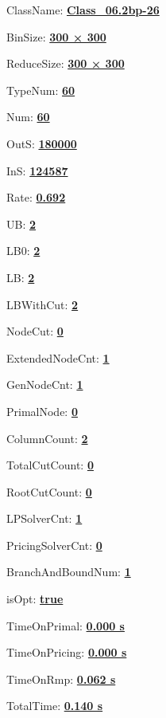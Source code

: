 \documentclass[11pt]{article}
\begin{document}
\pagestyle{empty}


ClassName: \underline{\textbf{Class_06.2bp-26}}
\par
BinSize: \underline{\textbf{300 × 300}}
\par
ReduceSize: \underline{\textbf{300 × 300}}
\par
TypeNum: \underline{\textbf{60}}
\par
Num: \underline{\textbf{60}}
\par
OutS: \underline{\textbf{180000}}
\par
InS: \underline{\textbf{124587}}
\par
Rate: \underline{\textbf{0.692}}
\par
UB: \underline{\textbf{2}}
\par
LB0: \underline{\textbf{2}}
\par
LB: \underline{\textbf{2}}
\par
LBWithCut: \underline{\textbf{2}}
\par
NodeCut: \underline{\textbf{0}}
\par
ExtendedNodeCnt: \underline{\textbf{1}}
\par
GenNodeCnt: \underline{\textbf{1}}
\par
PrimalNode: \underline{\textbf{0}}
\par
ColumnCount: \underline{\textbf{2}}
\par
TotalCutCount: \underline{\textbf{0}}
\par
RootCutCount: \underline{\textbf{0}}
\par
LPSolverCnt: \underline{\textbf{1}}
\par
PricingSolverCnt: \underline{\textbf{0}}
\par
BranchAndBoundNum: \underline{\textbf{1}}
\par
isOpt: \underline{\textbf{true}}
\par
TimeOnPrimal: \underline{\textbf{0.000 s}}
\par
TimeOnPricing: \underline{\textbf{0.000 s}}
\par
TimeOnRmp: \underline{\textbf{0.062 s}}
\par
TotalTime: \underline{\textbf{0.140 s}}
\par
\newpage
\end{document}
